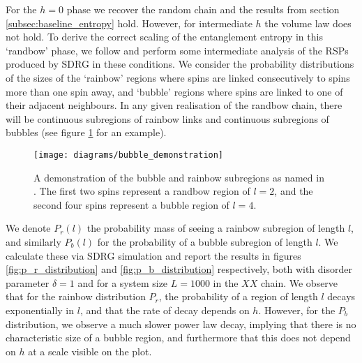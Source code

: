For the $h = 0$ phase we recover the random chain and the results from section \ref{subsec:baseline_entropy} hold. However, for intermediate $h$ the volume law does not hold. To derive the correct scaling of the entanglement entropy in this `randbow' phase, we follow \cite{paola2018} and perform some intermediate analysis of the RSPs produced by SDRG in these conditions. We consider the probability distributions of the sizes of the `rainbow' regions where spins are linked consecutively to spins more than one spin away, and `bubble' regions where spins are linked to one of their adjacent neighbours. In any given realisation of the randbow chain, there will be continuous subregions of rainbow links and continuous subregions of bubbles (see figure \ref{fig:bubble_demonstration} for an example). 

\begin{figure}[h]
	\centering
	\texttt{[image: diagrams/bubble\_demonstration]}	
	\caption{A demonstration of the bubble and rainbow subregions as named in \cite{paola2018}. The first two spins represent a randbow region of $l = 2$, and the second four spins represent a bubble region of $l = 4$.}
	\label{fig:bubble_demonstration}
\end{figure}

We denote $P_r(l)$ the probability mass of seeing a rainbow subregion of length $l$, and similarly $P_b(l)$ for the probability of a bubble subregion of length $l$. We calculate these via SDRG simulation and report the results in figures \ref{fig:p_r_distribution} and \ref{fig:p_b_distribution} respectively, both with disorder parameter $\delta = 1$ and for a system size $L = 1000$ in the $XX$ chain. We observe that for the rainbow distribution $P_r$, the probability of a region of length $l$ decays exponentially in $l$, and that the rate of decay depends on $h$. However, for the $P_b$ distribution, we observe a much slower power law decay, implying that there is no characteristic size of a bubble region, and furthermore that this does not depend on $h$ at a scale visible on the plot. 

